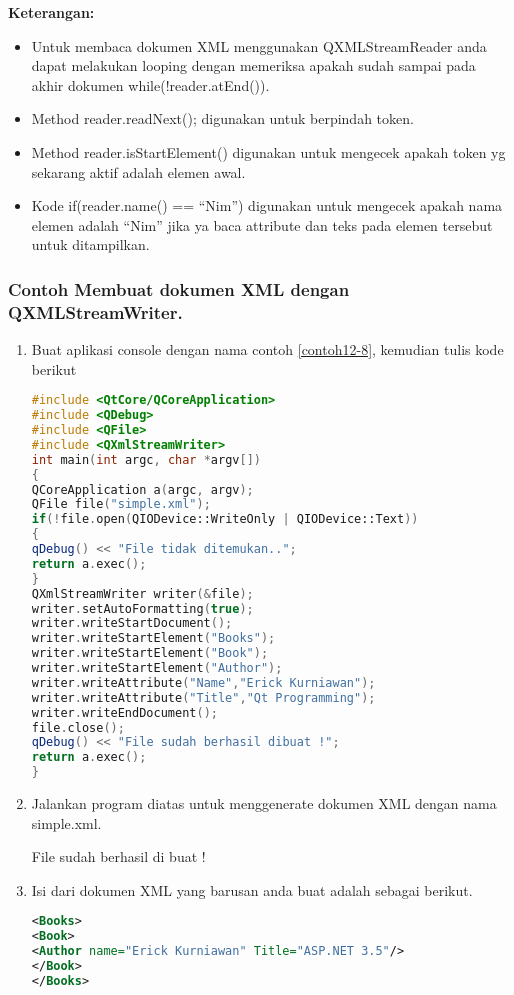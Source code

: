 \textbf{Keterangan:}

\begin{itemize}

\item
  Untuk membaca dokumen XML menggunakan QXMLStreamReader anda dapat
  melakukan looping dengan memeriksa apakah sudah sampai pada akhir
  dokumen while(!reader.atEnd()).
\item
  Method reader.readNext(); digunakan untuk berpindah token.
\item
  Method reader.isStartElement() digunakan untuk mengecek apakah token
  yg sekarang aktif adalah elemen awal.
\item
  Kode if(reader.name() == ``Nim'') digunakan untuk mengecek apakah nama
  elemen adalah ``Nim'' jika ya baca attribute dan teks pada elemen
  tersebut untuk ditampilkan.
\end{itemize}

\subsubsection*{Contoh  Membuat dokumen XML dengan QXMLStreamWriter.}

\begin{enumerate}

\item
  Buat aplikasi console dengan nama contoh \ref{contoh12-8}, kemudian tulis kode
  berikut

\begin{lstlisting}[language=c++, caption=Membuat dokumen XML dengan QXMLStreamWriter, label=contoh12-8]
#include <QtCore/QCoreApplication>
#include <QDebug>
#include <QFile>
#include <QXmlStreamWriter>
int main(int argc, char *argv[])
{
QCoreApplication a(argc, argv);
QFile file("simple.xml");
if(!file.open(QIODevice::WriteOnly | QIODevice::Text))
{
qDebug() << "File tidak ditemukan..";
return a.exec();
}
QXmlStreamWriter writer(&file);
writer.setAutoFormatting(true);
writer.writeStartDocument();
writer.writeStartElement("Books");
writer.writeStartElement("Book");
writer.writeStartElement("Author");
writer.writeAttribute("Name","Erick Kurniawan");
writer.writeAttribute("Title","Qt Programming");
writer.writeEndDocument();
file.close();
qDebug() << "File sudah berhasil dibuat !";
return a.exec();
}
\end{lstlisting}
\item
  Jalankan program diatas untuk menggenerate dokumen XML dengan nama
  simple.xml.
  \begin{lcverbatim}
File sudah berhasil di buat !
  \end{lcverbatim}
\item
  Isi dari dokumen XML yang barusan anda buat adalah sebagai berikut.

\begin{lstlisting}[language=xml]
<Books>
<Book>
<Author name="Erick Kurniawan" Title="ASP.NET 3.5"/>
</Book>
</Books>
\end{lstlisting}

\end{enumerate}

